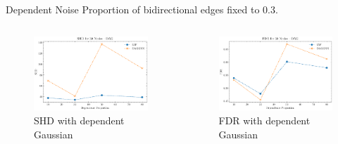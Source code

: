 \documentclass{beamer}
\begin{document}
\begin{frame}{Dependent Noise}
    Proportion of bidirectional edges fixed to 0.3.
    \begin{columns}
        \begin{column}{0.5\textwidth}
            \begin{figure}
                \centering
                \includegraphics[width=\textwidth]{fig/SHD_dependence_30_DAG_threshold0.3.pdf}
                \caption{SHD with dependent Gaussian}
                \label{fig:dep_gaussian_shd}
            \end{figure}
        \end{column}
        \begin{column}{0.5\textwidth}
            \begin{figure}
                \centering
                \includegraphics[width=\textwidth]{fig/FDR_dependence_30_DAG_threshold0.3.pdf}
                \caption{FDR with dependent Gaussian}
                \label{fig:dep_gaussian_fdr}
            \end{figure}
        \end{column}
    \end{columns}
\end{frame}
\end{document}
